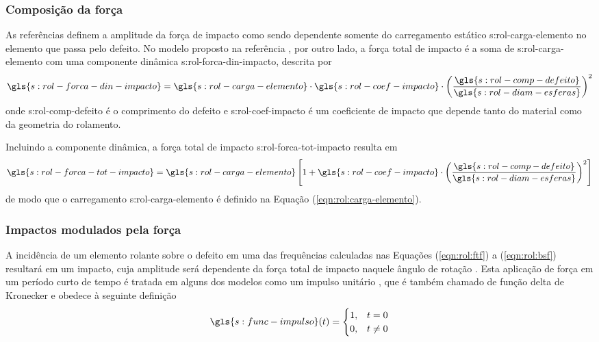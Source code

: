 \documentclass[12pt,oneside,english,brazil,lmodern,siglas,simbolos,cite=num]{ucsmonograph}
\begin{document}
	\subsubsection{Composição da força}
	As referências \cite{mcfadden:1984,tandon:1997} definem a amplitude da força de impacto como sendo dependente somente do carregamento estático \gls{s:rol-carga-elemento} no elemento que passa pelo defeito.
	No modelo proposto na referência \cite{sassi:2007}, por outro lado, a força total de impacto é a soma de \gls{s:rol-carga-elemento} com uma componente dinâmica \gls{s:rol-forca-din-impacto}, descrita por
	\begin{equation}
		\gls{s:rol-forca-din-impacto} =
		\gls{s:rol-carga-elemento}\cdot\gls{s:rol-coef-impacto}\cdot
		\left(\frac{\gls{s:rol-comp-defeito}}
		{\gls{s:rol-diam-esferas}}\right)^2
	\end{equation}
	onde \gls{s:rol-comp-defeito} é o comprimento do defeito e \gls{s:rol-coef-impacto} é um coeficiente de impacto que depende tanto do material como da geometria do rolamento.
	
	Incluindo a componente dinâmica, a força total de impacto \gls{s:rol-forca-tot-impacto} resulta em
	\begin{equation} \label{eqn:rol:forca-impacto-tot}
		\gls{s:rol-forca-tot-impacto} = \gls{s:rol-carga-elemento}
		\left[1 + \gls{s:rol-coef-impacto}\cdot
		\left(\frac{\gls{s:rol-comp-defeito}}
		{\gls{s:rol-diam-esferas}}\right)^2 \right]
	\end{equation}
	de modo que o carregamento \gls{s:rol-carga-elemento} é definido na Equação (\ref{eqn:rol:carga-elemento}).
	
	\subsubsection{Impactos modulados pela força}
	A incidência de um elemento rolante sobre o defeito em uma das frequências calculadas nas Equações (\ref{eqn:rol:ftf}) a (\ref{eqn:rol:bsf}) resultará em um impacto, cuja amplitude será dependente da força total de impacto naquele ângulo de rotação \cite{mcfadden:1984}.
	Esta aplicação de força em um período curto de tempo é tratada em alguns dos modelos como um impulso unitário \cite{mcfadden:1984,sassi:2007,cong:2013}, que é também chamado de função delta de Kronecker e obedece à seguinte definição \cite{rao:2008}
	\begin{equation}
		\gls{s:func-impulso}(t) = 
		\begin{cases}
			1,& t=0\\
			0,& t\ne 0
		\end{cases}
	\end{equation}
	
\end{document}
